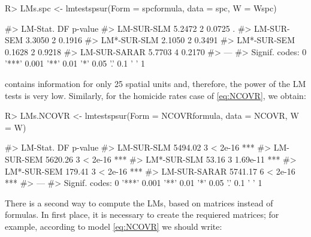 \documentclass[article]{jss}
\begin{document}
\begin{CodeChunk}

\begin{CodeInput}
R> LMs.spc <- lmtestspsur(Form = spcformula, data = spc, W = Wspc)
\end{CodeInput}

\begin{CodeOutput}
#>              LM-Stat. DF p-value  
#> LM-SUR-SLM     5.2472  2  0.0725 .
#> LM-SUR-SEM     3.3050  2  0.1916  
#> LM*-SUR-SLM    2.1050  2  0.3491  
#> LM*-SUR-SEM    0.1628  2  0.9218  
#> LM-SUR-SARAR   5.7703  4  0.2170  
#> ---
#> Signif. codes:  0 '***' 0.001 '**' 0.01 '*' 0.05 '.' 0.1 ' ' 1
\end{CodeOutput}
\end{CodeChunk}

 contains information for only 25 spatial units and, therefore, the power of the LM tests is very low. Similarly, for the homicide rates case of \eqref{eq:NCOVR}, we obtain:

\begin{CodeChunk}

\begin{CodeInput}
R> LMs.NCOVR <- lmtestspsur(Form = NCOVRformula, data = NCOVR, W = W)
\end{CodeInput}

\begin{CodeOutput}
#>              LM-Stat. DF  p-value    
#> LM-SUR-SLM    5494.02  3  < 2e-16 ***
#> LM-SUR-SEM    5620.26  3  < 2e-16 ***
#> LM*-SUR-SLM     53.16  3 1.69e-11 ***
#> LM*-SUR-SEM    179.41  3  < 2e-16 ***
#> LM-SUR-SARAR  5741.17  6  < 2e-16 ***
#> ---
#> Signif. codes:  0 '***' 0.001 '**' 0.01 '*' 0.05 '.' 0.1 ' ' 1
\end{CodeOutput}
\end{CodeChunk}

There is a second way to compute the LMs, based on matrices instead of formulas. In first place, it is necessary to create the requiered matrices; for example, according to model \eqref{eq:NCOVR} we should write:

\begin{CodeChunk}

\end{CodeChunk}
\end{document}

